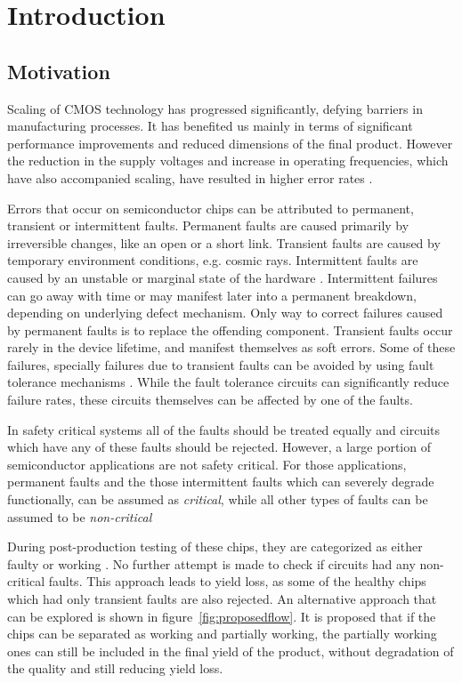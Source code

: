 \chapter{Introduction}

\section{Motivation}
Scaling of CMOS technology has progressed significantly, defying barriers in manufacturing processes. It has benefited us mainly in terms of significant performance improvements and reduced dimensions of the final product. However the reduction in the supply voltages and increase in operating frequencies, which have also accompanied scaling, have resulted in higher error rates \cite{Srinivasan2004, Constantinescu2007, Agostinelli2005}.

Errors that occur on semiconductor chips  can be attributed to permanent, transient or intermittent faults. Permanent faults are caused primarily by irreversible changes, like an open or a short link. Transient faults are caused by temporary environment conditions, e.g. cosmic rays. Intermittent faults are caused by an unstable or marginal state of the hardware \cite{Constantinescu2007}. Intermittent failures can go away with time or may manifest later into a permanent breakdown, depending on underlying defect mechanism. Only way to correct failures caused by permanent faults is to replace the offending component.  Transient faults occur rarely in the device lifetime, and manifest themselves as soft errors. Some of these failures, specially  failures due to transient faults can be avoided by using fault tolerance mechanisms \cite{Bartlett2004, Mitra2008}. While the fault tolerance circuits can significantly reduce failure rates, these circuits themselves can be affected by one of the faults.

In safety critical systems all of the faults should be treated equally and circuits which have any of these faults should be rejected. However, a large portion of semiconductor applications are not safety critical. For those applications, permanent faults and the those intermittent faults which can severely degrade functionally, can be assumed as \emph{critical}, while all other types of faults can be assumed to be \emph{non-critical}

During post-production testing of these chips, they are categorized as either faulty or working \cite{Agrawal2000}. No further attempt is made to check if circuits had any non-critical faults. This approach leads to yield loss, as some of the healthy chips which had only transient faults are also rejected. An alternative approach that can be explored is shown in figure~\ref{fig:proposedflow}. It is proposed that if the chips can be separated as working and partially working, the partially working ones can still be included in the final yield of the product, without degradation of the quality and still reducing yield loss.

